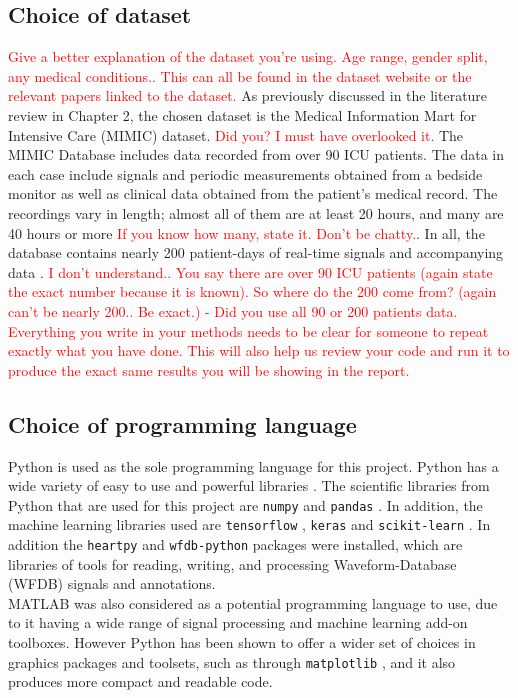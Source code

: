 \subsection{Choice of dataset}
\textcolor{red}{Give a better explanation of the dataset you're using. Age range, gender split, any medical conditions.. This can all be found in the dataset website or the relevant papers linked to the dataset.}
As previously discussed in the literature review in Chapter 2, the chosen dataset is the 
Medical Information Mart for Intensive Care (MIMIC) dataset. \textcolor{red}{Did you? I must have overlooked it.} The MIMIC Database 
includes data recorded from over 90 ICU patients. The data in each case include 
signals and periodic measurements obtained from a bedside monitor as well as clinical 
data obtained from the patient's medical record. The recordings vary in length; almost 
all of them are at least 20 hours, and many are 40 hours or more \textcolor{red}{If you know how many, state it. Don't be chatty.}. In all, the database 
contains nearly 200 patient-days of real-time signals and accompanying data \cite{Moody1996}.
\textcolor{red}{I don't understand.. You say there are over 90 ICU patients (again state the exact number because it is known). So where do the 200 come from? (again can't be nearly 200.. Be exact.) - Did you use all 90 or 200 patients data. Everything you write in your methods needs to be clear for someone to repeat exactly what you have done. This will also help us review your code and run it to produce the exact same results you will be showing in the report.}


\subsection{Choice of programming language}
Python is used as the sole programming language for this project. Python has a wide 
variety of easy to use and powerful libraries \cite{Python}. The scientific libraries from Python 
that are used for this project are \texttt{numpy} \cite{numpy} and \texttt{pandas} \cite{pandas}. In addition, the 
machine learning libraries used are \texttt{tensorflow} \cite{tensorflow}, \texttt{keras} \cite{keras} and \texttt{scikit-learn} \cite{scikit}. 
In addition the \texttt{heartpy} \cite{heartpy} and \texttt{wfdb-python} \cite{wfdb} packages were installed, which are libraries of 
tools for reading, writing, and processing Waveform-Database (WFDB) signals and annotations. \\ \newline \noindent MATLAB was also 
considered as a potential programming language to use, due to it having a wide range of 
signal processing and machine learning add-on toolboxes. However Python has been shown 
to offer a wider set of choices in graphics packages and toolsets, such as 
through \texttt{matplotlib} \cite{matplotlib}, and it also produces more compact and readable 
code.

